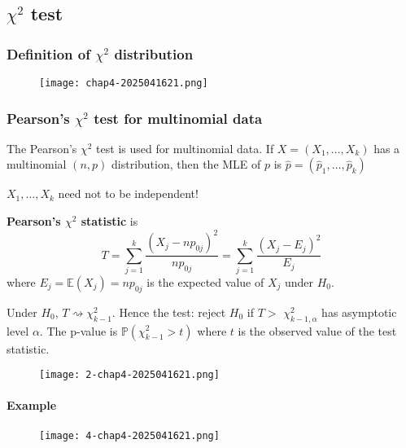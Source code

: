 \subsection{\texorpdfstring{$\chi^{2}$}{chi^2} test}

\subsubsection{Definition of \texorpdfstring{$\chi^{2}$}{chi^2} distribution}

\begin{figure}[H]
\centering
\texttt{[image: chap4-2025041621.png]}
\label{}
\end{figure}

\subsubsection{Pearson's \texorpdfstring{$\chi^{2}$}{chi^2} test for multinomial data}

The Pearson's $\chi^{2}$ test is used for multinomial data. If $X=(X_1,\dots,X_k)$ has a multinomial $(n,p)$ distribution, then the MLE of $p$ is $\widehat{p}=(\widehat{p}_{1},\dots,\widehat{p}_k)$

\begin{note}
$X_1,\dots,X_k$ need not to be independent!
\end{note}
\begin{definition}
\textbf{Pearson's $\chi^{2}$ statistic} is
\[
T=\sum_{j=1}^{k} \frac{(X_j-np_{0j})^2}{np_{0j}}=\sum_{j=1}^{k}\frac{(X_j-E_j)^2}{E_j} 
\]
where $E_j=\mathbb{E}(X_j)=np_{0j}$ is the expected value of $X_j$ under $H_0$.
\end{definition}
Under $H_0$, $T \rightsquigarrow \chi_{k-1}^2$. Hence the test: reject $H_0$ if $T>$ $\chi_{k-1, \alpha}^2$ has asymptotic level $\alpha$. The p-value is $\mathbb{P}\left(\chi_{k-1}^2>t\right)$ where $t$ is the observed value of the test statistic.

\begin{figure}[H]
\centering
\texttt{[image: 2-chap4-2025041621.png]}
\label{}
\end{figure}

\paragraph{Example}

\begin{figure}[H]
\centering
\texttt{[image: 4-chap4-2025041621.png]}
\label{}
\end{figure}

